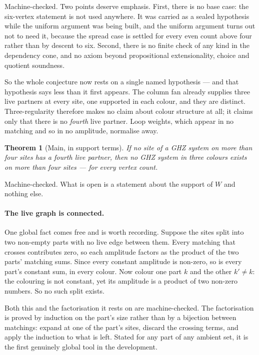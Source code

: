 \documentclass[11pt]{article}
\newtheorem{theorem}{Theorem}[section]
\theoremstyle{definition}
\theoremstyle{remark}
\begin{document}
Machine-checked. Two points deserve emphasis. First, there is no base case: the six-vertex
statement is not used anywhere. It was carried as a sealed hypothesis while the uniform
argument was being built, and the uniform argument turns out not to need it, because the
spread case is settled for every even count above four rather than by descent to six.
Second, there is no finite check of any kind in the dependency cone, and no axiom beyond
propositional extensionality, choice and quotient soundness.

So the whole conjecture now rests on a single named hypothesis --- and that hypothesis says
less than it first appears. The column fan already supplies three live partners at every
site, one supported in each colour, and they are distinct. Three-regularity therefore makes
no claim about colour structure at all; it claims only that there is no \emph{fourth} live
partner. Loop weights, which appear in no matching and so in no amplitude, normalise away.

\begin{theorem}[Main, in support terms]\label{thm:maindeg}
If no site of a GHZ system on more than four sites has a fourth live partner, then no GHZ
system in three colours exists on more than four sites --- for every vertex count.
\end{theorem}

Machine-checked. What is open is a statement about the support of $W$ and nothing else.

\paragraph{The live graph is connected.} One global fact comes free and is worth recording.
Suppose the sites split into two non-empty parts with no live edge between them. Every
matching that crosses contributes zero, so each amplitude factors as the product of the two
parts' matching sums. Since every constant amplitude is non-zero, so is every part's constant
sum, in every colour. Now colour one part $k$ and the other $k' \neq k$: the colouring is not
constant, yet its amplitude is a product of two non-zero numbers. So no such split exists.

Both this and the factorisation it rests on are machine-checked. The factorisation is proved
by induction on the part's size rather than by a bijection between matchings: expand at one of
the part's sites, discard the crossing terms, and apply the induction to what is left. Stated
for any part of any ambient set, it is the first genuinely global tool in the development.
\end{document}
